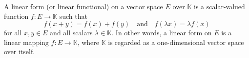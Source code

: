 A linear form (or linear functional) on a vector space $E$ over $\mathbb{K}$ is a scalar-valued function $f: E \to \mathbb{K}$ such that
$$f(x + y) = f(x) + f(y) \quad \text{and} \quad f(\lambda x) = \lambda f(x)$$
for all $x, y \in E$ and all scalars $\lambda \in \mathbb{K}$. In other words, a linear form on $E$ is a linear mapping $f: E \to \mathbb{K}$, where $\mathbb{K}$ is regarded as a one-dimensional vector space over itself.
